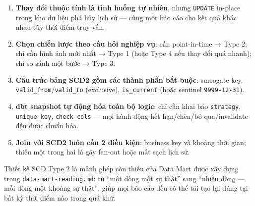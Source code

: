 \documentclass[12pt]{article}
\begin{document}
\begin{enumerate}
    \item \textbf{Thay đổi thuộc tính là tình huống tự nhiên}, nhưng \texttt{UPDATE} in-place trong kho dữ liệu phá hủy lịch sử --- cùng một báo cáo cho kết quả khác nhau tùy thời điểm truy vấn.
    \item \textbf{Chọn chiến lược theo câu hỏi nghiệp vụ}: cần point-in-time → Type 2; chỉ cần hình ảnh mới nhất → Type 1 (hoặc Type 4 nếu thay đổi quá nhanh); chỉ so sánh một bước → Type 3.
    \item \textbf{Cấu trúc bảng SCD2 gồm các thành phần bắt buộc}: surrogate key, \texttt{valid\_from}/\texttt{valid\_to} (exclusive), \texttt{is\_current} (hoặc sentinel \texttt{9999-12-31}).
    \item \textbf{dbt snapshot tự động hóa toàn bộ logic}: chỉ cần khai báo \texttt{strategy}, \texttt{unique\_key}, \texttt{check\_cols} --- mọi hành động hết hạn/chèn/bỏ qua/invalidate đều được chuẩn hóa.
    \item \textbf{Join với SCD2 luôn cần 2 điều kiện}: business key và khoảng thời gian; thiếu một trong hai là gây fan-out hoặc mất sạch lịch sử.
\end{enumerate}

Thiết kế SCD Type 2 là mảnh ghép còn thiếu của Data Mart được xây dựng trong \texttt{data-mart-reading.md}: từ ``một dòng một sự thật'' sang ``nhiều dòng --- mỗi dòng một khoảng sự thật'', giúp mọi báo cáo đều có thể tái tạo lại đúng tại bất kỳ thời điểm nào trong quá khứ.
\end{document}
